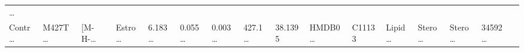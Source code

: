 \documentclass[
]{article}
\begin{document}
\begin{longtable}[]{@{}llllllllllllllll@{}}
\begin{minipage}[t]{0.02\columnwidth}
\ldots{}\strut
\end{minipage}\tabularnewline
\begin{minipage}[t]{0.04\columnwidth}\raggedright
Contr\ldots{}\strut
\end{minipage} & \begin{minipage}[t]{0.04\columnwidth}\raggedright
M427T\ldots{}\strut
\end{minipage} & \begin{minipage}[t]{0.04\columnwidth}\raggedright
{[}M-H-\ldots{}\strut
\end{minipage} & \begin{minipage}[t]{0.04\columnwidth}\raggedright
Estro\ldots{}\strut
\end{minipage} & \begin{minipage}[t]{0.04\columnwidth}\raggedright
6.183\ldots{}\strut
\end{minipage} & \begin{minipage}[t]{0.04\columnwidth}\raggedright
0.055\ldots{}\strut
\end{minipage} & \begin{minipage}[t]{0.04\columnwidth}\raggedright
0.003\ldots{}\strut
\end{minipage} & \begin{minipage}[t]{0.04\columnwidth}\raggedright
427.1\ldots{}\strut
\end{minipage} & \begin{minipage}[t]{0.04\columnwidth}\raggedright
38.1395\strut
\end{minipage} & \begin{minipage}[t]{0.04\columnwidth}\raggedright
HMDB0\ldots{}\strut
\end{minipage} & \begin{minipage}[t]{0.03\columnwidth}\raggedright
C11133\strut
\end{minipage} & \begin{minipage}[t]{0.04\columnwidth}\raggedright
Lipid\ldots{}\strut
\end{minipage} & \begin{minipage}[t]{0.04\columnwidth}\raggedright
Stero\ldots{}\strut
\end{minipage} & \begin{minipage}[t]{0.04\columnwidth}\raggedright
Stero\ldots{}\strut
\end{minipage} & \begin{minipage}[t]{0.04\columnwidth}\raggedright
34592\ldots{}\strut
\end{minipage} & \begin{minipage}[t]{0.02\columnwidth}\raggedright

\end{minipage}
\end{longtable}
\end{document}
